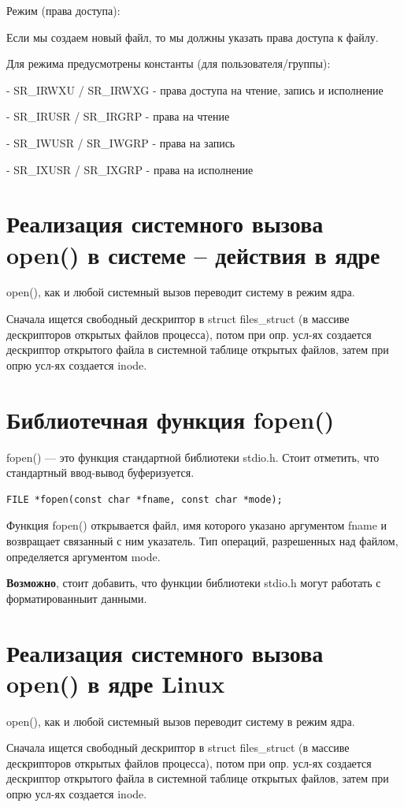 Режим (права доступа): 

Если мы создаем новый файл, то мы должны указать права доступа к файлу. 

Для режима предусмотрены константы (для пользователя/группы):

-  SR\_IRWXU / SR\_IRWXG - права доступа на чтение, запись и исполнение

- SR\_IRUSR / SR\_IRGRP - права на чтение

- SR\_IWUSR / SR\_IWGRP - права на запись

- SR\_IXUSR / SR\_IXGRP - права на исполнение

\section{Реализация системного вызова open() в системе – действия в ядре}
open(), как и любой системный вызов переводит систему в режим ядра.

Сначала ищется свободный дескриптор в struct files\_struct (в массиве дескрипторов открытых файлов процесса), потом при опр. усл-ях создается дескриптор открытого файла в системной таблице открытых файлов, затем при опрю усл-ях создается inode.

\section{Библиотечная функция fopen()}

fopen() — это функция стандартной библиотеки stdio.h. Стоит отметить, что стандартный ввод-вывод буферизуется.
\begin{lstlisting}
FILE *fopen(const char *fname, const char *mode);
\end{lstlisting}

Функция fopen() открывается файл, имя которого указано аргументом fname и возвращает связанный с ним указатель. Тип операций, разрешенных над файлом, определяется аргументом mode.

\textbf{Возможно}, стоит добавить, что функции библиотеки stdio.h могут работать с форматированныит данными.

\section{Реализация системного вызова open() в ядре Linux}
open(), как и любой системный вызов переводит систему в режим ядра.

Сначала ищется свободный дескриптор в struct files\_struct (в массиве дескрипторов открытых файлов процесса), потом при опр. усл-ях создается дескриптор открытого файла в системной таблице открытых файлов, затем при опрю усл-ях создается inode.


